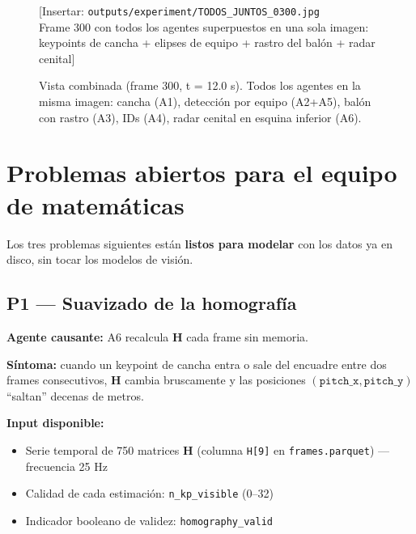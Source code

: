 \documentclass[11pt,a4paper]{article}
\begin{document}
\begin{figure}[H]
  \centering
  \begin{mdframed}[
    linecolor=gray!40, linewidth=1pt,
    innertopmargin=80pt, innerbottommargin=80pt,
    backgroundcolor=gray!8
  ]
    \centering\color{gray!60}
    \Large [Insertar: \texttt{outputs/experiment/TODOS\_JUNTOS\_0300.jpg} \\
    \normalsize Frame 300 con todos los agentes superpuestos en una sola imagen:\\
    keypoints de cancha + elipses de equipo + rastro del balón + radar cenital]
  \end{mdframed}
  \caption{Vista combinada (frame 300, t = 12.0 s). Todos los agentes en la misma
           imagen: cancha (A1), detección por equipo (A2+A5), balón con rastro
           (A3), IDs (A4), radar cenital en esquina inferior (A6).}
  \label{fig:todos_juntos}
\end{figure}

\section{Problemas abiertos para el equipo de matemáticas}

Los tres problemas siguientes están \textbf{listos para modelar}
con los datos ya en disco, sin tocar los modelos de visión.

\subsection{P1 — Suavizado de la homografía}

\textbf{Agente causante:} A6 recalcula $\mathbf{H}$ cada frame sin memoria.

\textbf{Síntoma:} cuando un keypoint de cancha entra o sale del encuadre entre
dos frames consecutivos, $\mathbf{H}$ cambia bruscamente y las posiciones
$(\texttt{pitch\_x}, \texttt{pitch\_y})$ ``saltan'' decenas de metros.

\textbf{Input disponible:}
\begin{itemize}[noitemsep]
  \item Serie temporal de 750 matrices $\mathbf{H}$ (columna \texttt{H[9]}
        en \texttt{frames.parquet}) — frecuencia 25 Hz
  \item Calidad de cada estimación: \texttt{n\_kp\_visible} (0–32)
  \item Indicador booleano de validez: \texttt{homography\_valid}
\end{itemize}
\end{document}
